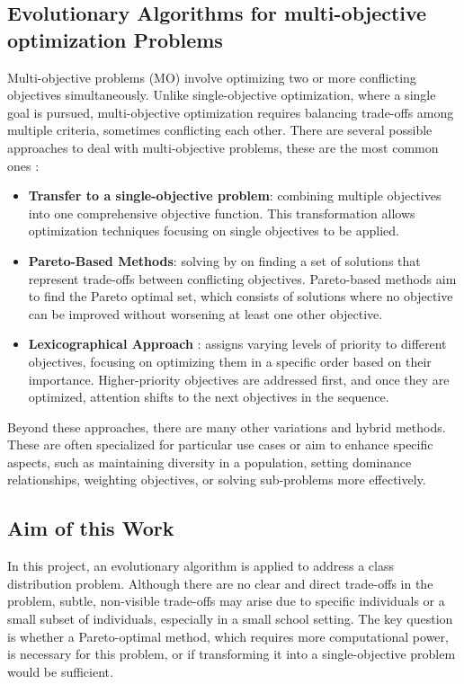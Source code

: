 \begin{onehalfspace}
\subsection{Evolutionary Algorithms for multi-objective optimization Problems}
Multi-objective problems (MO) involve optimizing two or more conflicting objectives 
simultaneously. Unlike single-objective optimization, where a single goal
is pursued, multi-objective optimization requires balancing trade-offs among multiple criteria, sometimes 
conflicting each other. There are several possible approaches to deal with multi-objective problems, these are the most common ones
 \citep{bartz2014evolutionary}:
\begin{itemize}
  \item \textbf{Transfer to a single-objective problem}: combining multiple objectives into one comprehensive objective function. This 
  transformation allows optimization techniques focusing on single objectives to be applied. 
  \item \textbf{Pareto-Based Methods}: solving by on finding a set of solutions 
  that represent trade-offs between conflicting objectives. Pareto-based methods 
   aim to find the Pareto optimal set, which consists of solutions where no objective can be 
   improved without worsening at least one other objective. 
  \item \textbf{Lexicographical Approach }:  assigns varying levels of priority to different 
  objectives, focusing on optimizing them in a specific order based on their importance. 
  Higher-priority objectives are addressed first, and once they are optimized, attention shifts to
   the next objectives in the sequence.
\end{itemize}
Beyond these approaches, there are many other variations and hybrid methods. These are often 
specialized for particular use cases or aim to enhance specific aspects, such as maintaining 
diversity in a population, setting dominance relationships, weighting objectives, or solving 
sub-problems more effectively. \citep{ojha2019review}


\subsection{Aim of this Work}

In this project, an evolutionary algorithm is applied to address a class 
distribution problem. Although there are no clear and direct trade-offs in the problem, 
subtle, non-visible trade-offs may arise due to specific individuals or a small subset of 
individuals, especially in a small school setting. The key question is whether a Pareto-optimal 
method, which requires more computational power, is necessary for this problem, or if transforming
it into a single-objective problem would be sufficient.
\\


\end{onehalfspace}
